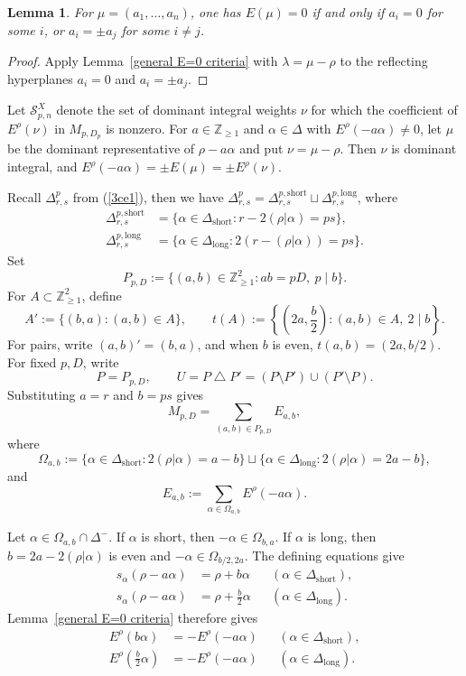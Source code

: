 \documentclass[11pt,a4paper]{amsart}
\newcommand{\ZZ}{\mathbb Z}
\theoremstyle{plain}
\newtheorem{lem}[theorem]{Lemma}
\numberwithin{equation}{section}
\newenvironment{pf}{\begin{proof}}{\end{proof}}
\begin{document}
\begin{lem}\label{lem:signed-permutation-alternants}
For \(\mu=(a_1,\ldots,a_n)\), one has \(E(\mu)=0\) if and only if
\(a_i=0\) for some \(i\), or \(a_i=\pm a_j\) for some \(i\ne j\).
\end{lem}

\begin{pf}
Apply Lemma~\ref{general E=0 criteria} with \(\lambda=\mu-\rho\)
to the reflecting hyperplanes \(a_i=0\) and \(a_i=\pm a_j\).
\end{pf}

Let \(\mathcal S^X_{p,n}\) denote the set of dominant integral
weights \(\nu\) for which the coefficient of \(E^\rho(\nu)\)
in \(M_{p,D_p}\) is nonzero.
For \(a\in\ZZ_{\ge1}\) and \(\alpha\in\Delta\) with
\(E^\rho(-a\alpha)\ne0\), let \(\mu\) be the dominant
representative of \(\rho-a\alpha\) and put \(\nu=\mu-\rho\).
Then \(\nu\) is dominant integral, and
\(E^\rho(-a\alpha)=\pm E(\mu)=\pm E^\rho(\nu)\).

Recall  $\Delta_{r,s}^p$ from (\ref{3ce1}), then we have
\(\Delta_{r,s}^p
=\Delta_{r,s}^{p,\mathrm{short}}
\sqcup\Delta_{r,s}^{p,\mathrm{long}}\), where
\[
\begin{aligned}
\Delta_{r,s}^{p,\mathrm{short}}
&=\{\alpha\in\Delta_{\mathrm{short}}:
r-2(\rho|\alpha)=ps\},\\
\Delta_{r,s}^{p,\mathrm{long}}
&=\{\alpha\in\Delta_{\mathrm{long}}:
2(r-(\rho|\alpha))=ps\}.
\end{aligned}
\]
Set
\begin{equation}\label{ce1}
P_{p,D}
:=\{(a,b)\in\ZZ_{\ge1}^2:ab=pD,\ p\mid b\}.
\end{equation}
For \(A\subset\ZZ_{\ge1}^2\), define
\[
A':=\{(b,a):(a,b)\in A\},
\qquad
t(A):=\left\{\left(2a,\frac b2\right):
(a,b)\in A,\ 2\mid b\right\}.
\]
For pairs, write \((a,b)'=(b,a)\), and  when \(b\) is even,
\(t(a,b)=(2a,b/2)\).
For fixed \(p,D\), write
\[
P=P_{p,D},
\qquad
U=P\mathbin{\triangle}P'
=(P\setminus P')\cup(P'\setminus P).
\]
Substituting \(a=r\) and \(b=ps\) gives
\[
M_{p,D}=\sum_{(a,b)\in P_{p,D}}E_{a,b},
\]
where
\[
\Omega_{a,b}
:=
\{\alpha\in\Delta_{\mathrm{short}}:
2(\rho|\alpha)=a-b\}
\sqcup
\{\alpha\in\Delta_{\mathrm{long}}:
2(\rho|\alpha)=2a-b\},
\]
and
\[
E_{a,b}
:=\sum_{\alpha\in\Omega_{a,b}}E^\rho(-a\alpha).
\]

Let \(\alpha\in\Omega_{a,b}\cap\Delta^-\).
If \(\alpha\) is short, then \(-\alpha\in\Omega_{b,a}\).
If \(\alpha\) is long, then
\(b=2a-2(\rho|\alpha)\) is even and
\(-\alpha\in\Omega_{b/2,2a}\).
The defining equations give
\[
\begin{aligned}
s_\alpha(\rho-a\alpha)&=\rho+b\alpha
&&(\alpha\in\Delta_{\mathrm{short}}),\\
s_\alpha(\rho-a\alpha)&=\rho+\frac b2\alpha
&&(\alpha\in\Delta_{\mathrm{long}}).
\end{aligned}
\]
Lemma~\ref{general E=0 criteria} therefore gives
\[
\begin{aligned}
E^\rho(b\alpha)&=-E^\rho(-a\alpha)
&&(\alpha\in\Delta_{\mathrm{short}}),\\
E^\rho\left(\frac b2\alpha\right)&=-E^\rho(-a\alpha)
&&(\alpha\in\Delta_{\mathrm{long}}).
\end{aligned}
\]
\end{document}
